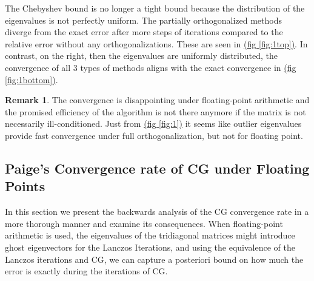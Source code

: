 \documentclass[]{article}
\theoremstyle{definition}
\newtheorem{remark}{Remark}[subsection]  %
\begin{document}
        The Chebyshev bound is no longer a tight bound because the distribution of the eigenvalues is not perfectly uniform. The partially orthogonalized methods diverge from the exact error after more steps of iterations compared to the relative error without any orthogonalizations. These are seen in \hyperref[fig:1]{(fig \ref*{fig:1top})}. In contrast, on the right, then the eigenvalues are uniformly distributed, the convergence of all 3 types of methods aligns with the exact convergence in \hyperref[fig:1]{(fig \ref*{fig:1bottom})}. 
        \begin{remark}
            The convergence is disappointing under floating-point arithmetic and the promised efficiency of the algorithm is not there anymore if the matrix is not necessarily ill-conditioned. Just from \hyperref[fig:1]{(fig \ref*{fig:1})} it seems like outlier eigenvalues provide fast convergence under full orthogonalization, but not for floating point. 
        \end{remark}
    \subsection{Paige's Convergence rate of CG under Floating Points}
        In this section we present the backwards analysis of the CG convergence rate in a more thorough manner and examine its consequences. When floating-point arithmetic is used, the eigenvalues of the tridiagonal matrices might introduce ghost eigenvectors for the Lanczos Iterations, and using the equivalence of the Lanczos iterations and CG, we can capture a posteriori bound on how much the error is exactly during the iterations of CG. 
\end{document}
